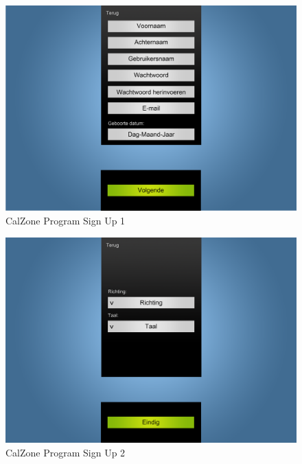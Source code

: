 \begin{center}
\begin{figure}[H]
\caption{CalZone Program Sign Up 1}
\centerline{\includegraphics[scale=0.4]{img/Calzonesignup1}}
\label{fig:CalZone Program Sign Up}
\end{figure}

\begin{figure}[H]
\caption{CalZone Program Sign Up 2}
\centerline{\includegraphics[scale=0.4]{img/Calzonesignup2}}
\label{fig:CalZone Program Sign Up 2}
\end{figure}

\end{center}
\clearpage

